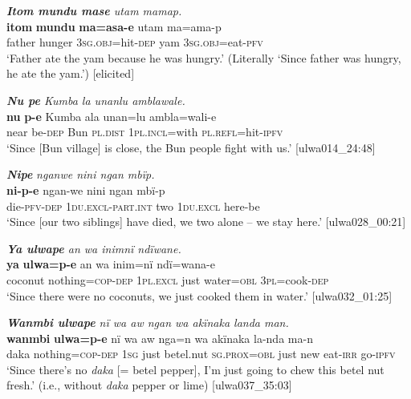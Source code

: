 \ea%
    \label{ex:complex:44}
          \textit{\textbf{Itom mundu mase} utam mamap.}\\
\gll    \textbf{itom}  \textbf{mundu}  \textbf{ma=asa-e}      utam  ma=ama-p\\
    father  hunger    3\textsc{sg.obj}=hit-\textsc{dep}  yam  3\textsc{sg.obj}=eat-\textsc{pfv}\\
\glt `Father ate the yam because he was hungry.’ (Literally ‘Since father was hungry, he ate the yam.’) [elicited]
\z

\ea%
    \label{ex:complex:45}
         \textit{\textbf{Nu pe} Kumba la unanlu amblawale.}\\
\gll    \textbf{nu}    \textbf{p-e}    Kumba  ala      unan=lu      ambla=wali-e\\
    near  be\textsc{{}-dep} Bun  \textsc{pl.dist}  1\textsc{pl.incl}=with    \textsc{pl.refl}=hit-\textsc{ipfv}\\
\glt `Since [Bun village] is close, the Bun people fight with us.’ [ulwa014\_24:48]
\z

\ea%
    \label{ex:complex:46}
          \textbf{\textit{Nipe}} \textit{nganwe nini ngan mbïp.}\\
\gll    \textbf{ni-p-e}      ngan-we        nini  ngan    mbï-p\\
    die-\textsc{pfv-dep}  \textsc{1du.excl-part.int}  two  \textsc{1du.excl}  here-be\\
\glt `Since [our two siblings] have died, we two alone -- we stay here.’ [ulwa028\_00:21]
\z

\ea%
    \label{ex:complex:47}
         \textit{\textbf{Ya ulwape} an wa inimnï ndïwane.}\\
\gll    \textbf{ya}      \textbf{ulwa=p-e}      an      wa  inim=nï     ndï=wana-e\\
    coconut  nothing=\textsc{cop{}-dep}  \textsc{1pl.excl} just  water=\textsc{obl}    3\textsc{pl}=cook-\textsc{dep}\\
\glt `Since there were no coconuts, we just cooked them in water.’ [ulwa032\_01:25]
\z

\ea%
    \label{ex:complex:48}
          \textit{\textbf{Wanmbi ulwape} nï wa aw ngan wa akïnaka landa man.}\\
\gll    \textbf{wanmbi}  \textbf{ulwa=p-e}      nï    wa  aw      nga=n     wa  akïnaka  la-nda  ma-n\\
    daka    nothing=\textsc{cop}{}-\textsc{dep}  \textsc{1sg}  just  betel.nut  \textsc{sg.prox=obl}    just  new    eat-\textsc{irr}  go-\textsc{ipfv}\\
\glt `Since there’s no \textit{daka} [= betel pepper], I’m just going to chew this betel nut fresh.’ (i.e., without \textit{daka} pepper or lime) [ulwa037\_35:03]
\z

